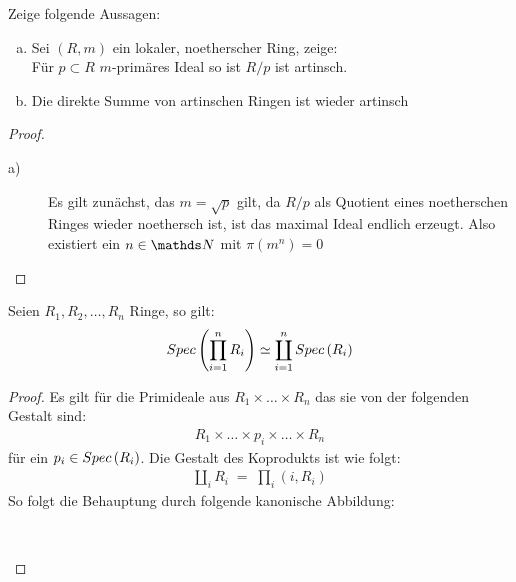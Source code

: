 \documentclass[ngerman, parskip=half, titlepage=false]{scrartcl}
\begin{document}
\begin{Satz}
  Zeige folgende Aussagen:
  \begin{enumerate}[a)]
  \item  Sei $(R,m)$ ein lokaler, noetherscher Ring, zeige: \\
    Für $p \subset R$ $m$-primäres Ideal so ist $R/p$ ist artinsch.
  \item Die direkte Summe von artinschen Ringen ist wieder artinsch
  \end{enumerate}
  \begin{proof}
    \begin{description}
    \item[a)] Es gilt zunächst, das $m = \sqrt{p}$ gilt, da $R/p$ als Quotient eines
      noetherschen Ringes wieder noethersch ist, ist das maximal Ideal endlich  
      erzeugt. Also existiert ein $n \in \N$ mit $\pi(m^n) = 0$
    \end{description}
  \end{proof}
\end{Satz}

\begin{Satz}
  Seien $R_1,R_2,\ldots,R_n$ Ringe, so gilt:
  \begin{gather*}
    Spec \left( \prod\limits_{i = 1}^n R_i \right) \simeq \coprod\limits_{i=1}^n Spec \left( R_i \right)
  \end{gather*}
  \begin{proof}
    Es gilt für die Primideale aus $R_1 \times \ldots \times R_n$ das sie von 
    der folgenden Gestalt sind:
    \begin{gather*}
      R_1 \times \ldots \times p_i \times \ldots \times  R_n
    \end{gather*}
    für ein $p_i \in Spec \left( R_i \right)$. Die Gestalt des Koprodukts ist wie folgt:
    \begin{gather*}
      \coprod\limits_{i} R_i \; = \;  \prod\limits_i (i,R_i)
    \end{gather*}
    So folgt die Behauptung durch folgende kanonische Abbildung:\\
    \begin{center}
    \\
  \end{center}
\end{proof}
\end{Satz}
\end{document}
